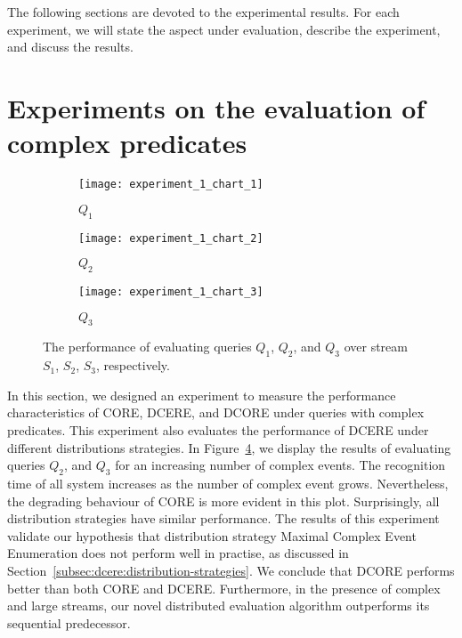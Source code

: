 The following sections are devoted to the experimental results. For each experiment, we will state the aspect under evaluation, describe the experiment, and discuss the results.

\section{Experiments on the evaluation of complex predicates}\label{sec:predicates}

\begin{figure}[t]
     \begin{adjustbox}{max width=1.3\linewidth,center}
     \centering
     \begin{subfigure}[b]{0.7\textwidth}
         \centering
         \texttt{[image: experiment\_1\_chart\_1]}
         \caption{$Q_{1}$}
         \label{fig:experiment:1:subfigure:1}
     \end{subfigure}
     \begin{subfigure}[b]{0.7\textwidth}
         \centering
         \texttt{[image: experiment\_1\_chart\_2]}
         \caption{$Q_{2}$}
         \label{fig:experiment:1:subfigure:2}
     \end{subfigure}
     \end{adjustbox}
     \begin{center}
      \begin{subfigure}[b]{0.7\textwidth}
          \centering
          \texttt{[image: experiment\_1\_chart\_3]}
          \caption{$Q_{3}$}
          \label{fig:experiment:1:subfigure:3}
      \end{subfigure}
     \end{center}
     \caption{The performance of evaluating queries $Q_{1}$, $Q_{2}$, and $Q_{3}$ over stream $S_{1}$, $S_{2}$, $S_{3}$, respectively.}
     \label{fig:experiment:1}
\end{figure}

In this section, we designed an experiment to measure the performance characteristics of CORE, DCERE, and DCORE under queries with complex predicates. This experiment also evaluates the performance of DCERE under different distributions strategies. In Figure~\ref{fig:experiment:1}, we display the results of evaluating queries $Q_{2}$, and $Q_{3}$ for an increasing number of complex events. The recognition time of all system increases as the number of complex event grows. Nevertheless, the degrading behaviour of CORE is more evident in this plot. Surprisingly, all distribution strategies have similar performance. The results of this experiment validate our hypothesis that distribution strategy Maximal Complex Event Enumeration does not perform well in practise, as discussed in Section~\ref{subsec:dcere:distribution-strategies}. We conclude that DCORE performs better than both CORE and DCERE. Furthermore, in the presence of complex and large streams, our novel distributed evaluation algorithm outperforms its sequential predecessor.


